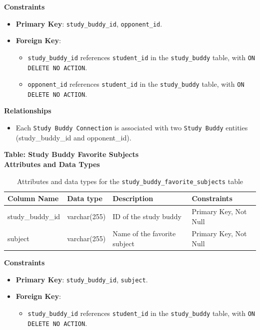 \documentclass[12pt]{article}
\begin{document}
    \noindent 
    \textbf{Constraints} 
    \begin{itemize} 
        \item \textbf{Primary Key}: \texttt{study\_buddy\_id}, \texttt{opponent\_id}. 
        \item \textbf{Foreign Key}: \begin{itemize} 
            \item \texttt{study\_buddy\_id} references \texttt{student\_id} in the \texttt{study\_buddy} table, with \texttt{ON DELETE NO ACTION}. 
            \item \texttt{opponent\_id} references \texttt{student\_id} in the \texttt{study\_buddy} table, with \texttt{ON DELETE NO ACTION}. 
        \end{itemize} 
    \end{itemize}

    \noindent 
    \textbf{Relationships} 
    \begin{itemize} 
        \item Each \texttt{Study Buddy Connection} is associated with two \texttt{Study Buddy} entities (study\_buddy\_id and opponent\_id). 
    \end{itemize}

    \pagebreak

    \textbf{Table: Study Buddy Favorite Subjects} \\

    \textbf{Attributes and Data Types}
    \begin{table}[H] 
        \centering 
        \renewcommand{\arraystretch}{1.5} 
        \begin{tabular}{|l|l|p{4.5cm}|l|} 
        \hline 
        \rowcolor[HTML]{96FFFB} 
        \textbf{Column Name} & \textbf{Data type} & \textbf{Description} & \textbf{Constraints} \\ \hline 
        study\_buddy\_id & varchar(255) & ID of the study buddy & Primary Key, Not Null \\ \hline 
        subject & varchar(255) & Name of the favorite subject & Primary Key, Not Null \\ \hline 
        \end{tabular} 
        \caption{Attributes and data types for the \texttt{study\_buddy\_favorite\_subjects} table} 
    \end{table}

    \noindent 
    \textbf{Constraints} 
    \begin{itemize} 
        \item \textbf{Primary Key}: \texttt{study\_buddy\_id}, \texttt{subject}. 
        \item \textbf{Foreign Key}: \begin{itemize} \item \texttt{study\_buddy\_id} references \texttt{student\_id} in the \texttt{study\_buddy} table, with \texttt{ON DELETE NO ACTION}. 
        \end{itemize} 
    \end{itemize}
\end{document}
